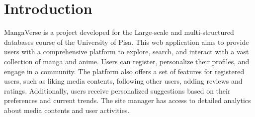 \chapter{Introduction}



MangaVerse is a project developed for the Large-scale and multi-structured databases course of the University of Pisa.
This web application aims to provide users with a comprehensive platform to explore, search, and interact with a vast collection of manga and anime. Users can register, personalize their profiles, and engage in a community. The platform also offers a set of features for registered users, such as liking media contents, following other users, adding reviews and ratings. 
Additionally, users receive personalized suggestions based on their preferences and current trends. The site manager has access to detailed analytics about media contents and user activities.
